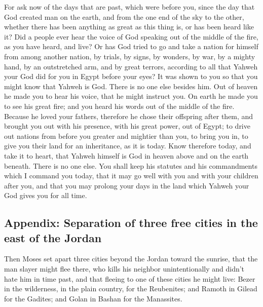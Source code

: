 \begin{paracol}{2}
\begin{otherlanguage}{english}
 For ask now of the days that are past, which were before
you, since the day that God created man on the earth, and from the one
end of the sky to the other, whether there has been anything as great as
this thing is, or has been heard like it?  Did a people
ever hear the voice of God speaking out of the middle of the fire, as
you have heard, and live?  Or has God tried to go and
take a nation for himself from among another nation, by trials, by
signs, by wonders, by war, by a mighty hand, by an outstretched arm, and
by great terrors, according to all that Yahweh your God did for you in
Egypt before your eyes?  It was shown to you so that you
might know that Yahweh is God. There is no one else besides him.
 Out of heaven he made you to hear his voice, that he
might instruct you. On earth he made you to see his great fire; and you
heard his words out of the middle of the fire.  Because
he loved your fathers, therefore he chose their offspring after them,
and brought you out with his presence, with his great power, out of
Egypt;  to drive out nations from before you greater and
mightier than you, to bring you in, to give you their land for an
inheritance, as it is today.  Know therefore today, and
take it to heart, that Yahweh himself is God in heaven above and on the
earth beneath. There is no one else.  You shall keep his
statutes and his commandments which I command you today, that it may go
well with you and with your children after you, and that you may prolong
your days in the land which Yahweh your God gives you for all time.

\hypertarget{appendix-separation-of-three-free-cities-in-the-east-of-the-jordan}{%
\subsection{Appendix: Separation of three free cities in the east of the
Jordan}\label{appendix-separation-of-three-free-cities-in-the-east-of-the-jordan}}

 Then Moses set apart three cities beyond the Jordan
toward the sunrise,  that the man slayer might flee
there, who kills his neighbor unintentionally and didn't hate him in
time past, and that fleeing to one of these cities he might live:
 Bezer in the wilderness, in the plain country, for the
Reubenites; and Ramoth in Gilead for the Gadites; and Golan in Bashan
for the Manassites.


\end{otherlanguage}
\end{paracol}
